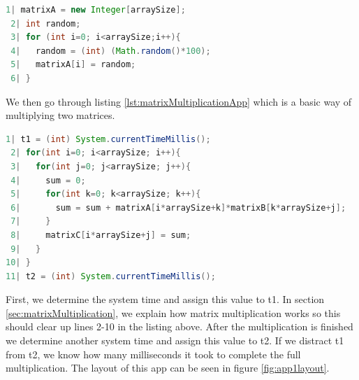 \documentclass[a4paper, 11pt]{report}
\begin{document}
\begin{lstlisting}[caption={Creating matrix},captionpos=b, label={lst:createMatrix}, language=java, float=ht]
 1| matrixA = new Integer[arraySize];
 2| int random;
 3| for (int i=0; i<arraySize;i++){
 4|   random = (int) (Math.random()*100);
 5|   matrixA[i] = random;
 6| }
\end{lstlisting}
We then go through listing \ref{lst:matrixMultiplicationApp} which is a basic way of multiplying two matrices.
\begin{lstlisting}[caption={Code for matrix multiplication on Android phone},captionpos=b, label={lst:matrixMultiplicationApp}, language=java, float=ht]
 1| t1 = (int) System.currentTimeMillis();
 2| for(int i=0; i<arraySize; i++){
 3|   for(int j=0; j<arraySize; j++){
 4|     sum = 0;
 5|     for(int k=0; k<arraySize; k++){
 6|       sum = sum + matrixA[i*arraySize+k]*matrixB[k*arraySize+j];
 7|     }
 8|     matrixC[i*arraySize+j] = sum;
 9|   }
10| }
11| t2 = (int) System.currentTimeMillis();
\end{lstlisting}

First, we determine the system time and assign this value to t1. In section \ref{sec:matrixMultiplication}, we explain how matrix multiplication works so this should clear up lines 2-10 in the listing above. After the multiplication is finished we determine another system time and assign this value to t2. If we distract t1 from t2, we know how many milliseconds it took to complete the full multiplication. The layout of this app can be seen in figure \ref{fig:app1layout}.
\end{document}
